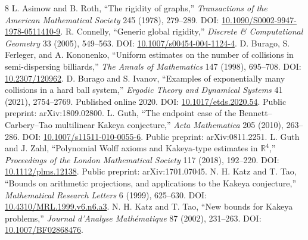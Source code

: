 \documentclass[11pt]{article}
\theoremstyle{definition}
\theoremstyle{remark}
\begin{document}
\begin{thebibliography}{8}
 L. Asimow and B. Roth, ``The rigidity of graphs,'' \emph{Transactions of the American Mathematical Society} 245 (1978), 279--289. DOI: \href{https://doi.org/10.1090/S0002-9947-1978-0511410-9}{10.1090/S0002-9947-1978-0511410-9}.
 R. Connelly, ``Generic global rigidity,'' \emph{Discrete \& Computational Geometry} 33 (2005), 549--563. DOI: \href{https://doi.org/10.1007/s00454-004-1124-4}{10.1007/s00454-004-1124-4}.
 D. Burago, S. Ferleger, and A. Kononenko, ``Uniform estimates on the number of collisions in semi-dispersing billiards,'' \emph{The Annals of Mathematics} 147 (1998), 695--708. DOI: \href{https://doi.org/10.2307/120962}{10.2307/120962}.
 D. Burago and S. Ivanov, ``Examples of exponentially many collisions in a hard ball system,'' \emph{Ergodic Theory and Dynamical Systems} 41 (2021), 2754--2769. Published online 2020. DOI: \href{https://doi.org/10.1017/etds.2020.54}{10.1017/etds.2020.54}. Public preprint: arXiv:1809.02800.
 L. Guth, ``The endpoint case of the Bennett--Carbery--Tao multilinear Kakeya conjecture,'' \emph{Acta Mathematica} 205 (2010), 263--286. DOI: \href{https://doi.org/10.1007/s11511-010-0055-6}{10.1007/s11511-010-0055-6}. Public preprint: arXiv:0811.2251.
 L. Guth and J. Zahl, ``Polynomial Wolff axioms and Kakeya-type estimates in $\mathbb R^4$,'' \emph{Proceedings of the London Mathematical Society} 117 (2018), 192--220. DOI: \href{https://doi.org/10.1112/plms.12138}{10.1112/plms.12138}. Public preprint: arXiv:1701.07045.
 N. H. Katz and T. Tao, ``Bounds on arithmetic projections, and applications to the Kakeya conjecture,'' \emph{Mathematical Research Letters} 6 (1999), 625--630. DOI: \href{https://doi.org/10.4310/MRL.1999.v6.n6.a3}{10.4310/MRL.1999.v6.n6.a3}.
 N. H. Katz and T. Tao, ``New bounds for Kakeya problems,'' \emph{Journal d'Analyse Mathématique} 87 (2002), 231--263. DOI: \href{https://doi.org/10.1007/BF02868476}{10.1007/BF02868476}.
\end{thebibliography}
\end{document}
